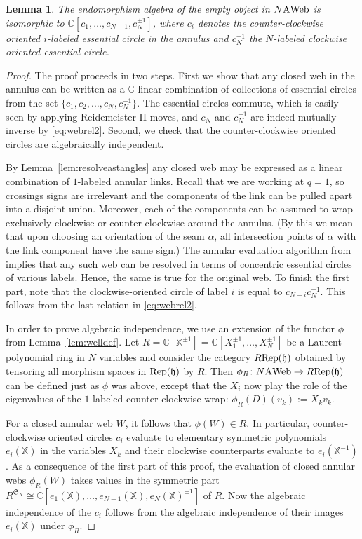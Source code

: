 \documentclass[11pt]{article}
\newtheorem{lemma}[theo]{Lemma}
\theoremstyle{definition}
\numberwithin{equation}{section}
\def\C{{\mathbb C}}
\def\X{{\mathbb X}}
\newcommand{\reph}{\Rep(\h)}
\def\h{{\mathfrak h}}
\newcommand{\Rep}{\cat{Rep}}
\newcommand{\cat}[1]{\ensuremath{\mbox{\bfseries {\upshape {#1}}}}}
\newcommand{\AWeb}[1][]{#1\cat{A}\cat{Web}}
\begin{document}
\begin{lemma}\label{lem:endempty} The endomorphism algebra of the empty object
in $\AWeb[N]$ is isomorphic to $\C[c_1,\dots, c_{N-1}, c_N^{\pm 1}]$, where
$c_i$ denotes the counter-clockwise oriented $i$-labeled essential circle in the
annulus and $c_N^{-1}$ the $N$-labeled clockwise oriented essential circle.
\end{lemma}
\begin{proof}
The proof proceeds in two steps. First we show that any closed web in the
annulus can be written as a $\C$-linear combination of collections of essential
circles from the set $\{c_1,c_2, \dots, c_N, c_N^{-1}\}$. The essential circles
commute, which is easily seen by applying Reidemeister II moves, and $c_N$ and
$c_N^{-1}$ are indeed mutually inverse by \eqref{eq:webrel2}. Second, we check that the
counter-clockwise oriented circles are algebraically independent. 

  By Lemma~\ref{lem:resolveastangles} any closed web may be expressed as a linear
    combination of $1$-labeled annular links. Recall that we are working at $q=1$,
    so crossings signs are irrelevant and the components of the link can be pulled
    apart into a disjoint union. Moreover, each of the components can be assumed
    to wrap exclusively clockwise or counter-clockwise around the annulus. (By
    this we mean that upon choosing an orientation of the seam $\alpha$, all
    intersection points of $\alpha$ with the link component have the same sign.)
    The annular evaluation algorithm from \cite[Lemma 5.2]{QR2} implies that any
    such web can be resolved in terms of concentric essential circles of various
    labels. Hence, the same is true for the original web. To finish the first
    part, note that the clockwise-oriented circle of label $i$ is equal to
    $c_{N-i}c_N^{-1}$. This follows from the last relation in \eqref{eq:webrel2}. 




In order to prove algebraic independence, we use an extension of the functor
$\phi$ from Lemma~\ref{lem:welldef}. Let $R=\C[\X^{\pm 1} ]=\C[X_1^{\pm
1},\dots, X_N^{\pm 1}]$ be a Laurent polynomial ring in $N$ variables and
consider the category $R\reph$ obtained by tensoring all morphism spaces in
$\reph$ by $R$. Then $\phi_R\colon \AWeb[N] \to R\reph$ can be defined just as
$\phi$ was above, except that the $X_i$ now play the role of the eigenvalues of
the $1$-labeled counter-clockwise wrap: $\phi_R(D)(v_k):=X_k v_k$. 

For a closed annular web $W$, it follows that $\phi(W)\in R$. In particular,
counter-clockwise oriented circles $c_i$ evaluate to elementary symmetric
polynomials $e_i(\X)$ in the variables $X_k$ and their clockwise counterparts
evaluate to $e_i(\X^{-1})$. As a consequence of the first part of this proof,
the evaluation of closed annular webs $\phi_R(W)$ takes values in the symmetric
part $R^{\mathfrak{S}_N} \cong \C[e_1(\X),\dots, e_{N-1}(\X), e_{N}(\X)^{\pm
1}]$ of $R$. Now the algebraic independence of the $c_i$ follows from the
algebraic independence of their images $e_i(\X)$ under $\phi_R$.
\end{proof}
\end{document}
